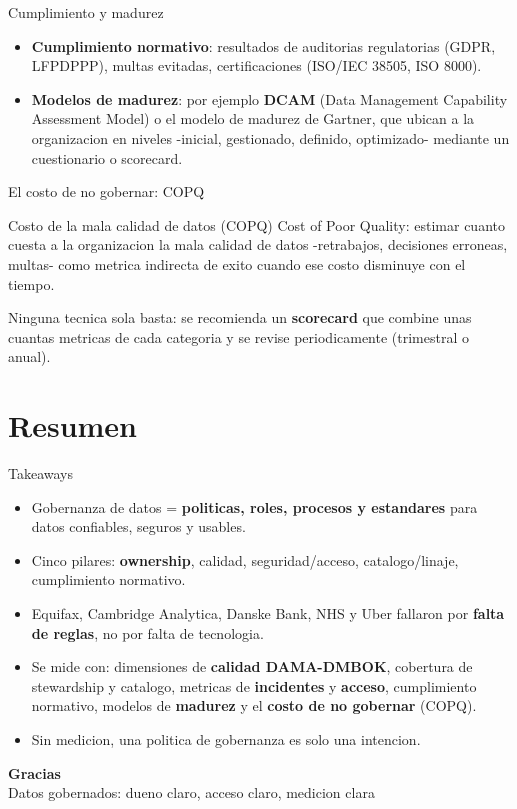 \documentclass[aspectratio=169]{beamer}
\begin{document}
\begin{frame}{Cumplimiento y madurez}
  \begin{itemize}
    \item \textbf{Cumplimiento normativo}: resultados de auditorias
          regulatorias (GDPR, LFPDPPP), multas evitadas, certificaciones
          (ISO/IEC 38505, ISO 8000).
    \item \textbf{Modelos de madurez}: por ejemplo \textbf{DCAM} (Data
          Management Capability Assessment Model) o el modelo de madurez de
          Gartner, que ubican a la organizacion en niveles -inicial,
          gestionado, definido, optimizado- mediante un cuestionario o
          scorecard.
  \end{itemize}
\end{frame}

\begin{frame}{El costo de no gobernar: COPQ}
  \begin{block}{Costo de la mala calidad de datos (COPQ)}
    Cost of Poor Quality: estimar cuanto cuesta a la organizacion la mala
    calidad de datos -retrabajos, decisiones erroneas, multas- como metrica
    indirecta de exito cuando ese costo disminuye con el tiempo.
  \end{block}
  Ninguna tecnica sola basta: se recomienda un \textbf{scorecard} que combine
  unas cuantas metricas de cada categoria y se revise periodicamente
  (trimestral o anual).
\end{frame}

\section{Resumen}

\begin{frame}{Takeaways}
  \begin{itemize}
    \item Gobernanza de datos = \textbf{politicas, roles, procesos y
          estandares} para datos confiables, seguros y usables.
    \item Cinco pilares: \textbf{ownership}, calidad, seguridad/acceso,
          catalogo/linaje, cumplimiento normativo.
    \item Equifax, Cambridge Analytica, Danske Bank, NHS y Uber fallaron por
          \textbf{falta de reglas}, no por falta de tecnologia.
    \item Se mide con: dimensiones de \textbf{calidad DAMA-DMBOK}, cobertura
          de stewardship y catalogo, metricas de \textbf{incidentes} y
          \textbf{acceso}, cumplimiento normativo, modelos de
          \textbf{madurez} y el \textbf{costo de no gobernar} (COPQ).
    \item Sin medicion, una politica de gobernanza es solo una intencion.
  \end{itemize}
\end{frame}

\begin{frame}[plain]
  \molinaBanner
  \vfill
  \begin{center}
    {\color{molMorado}\Large\bfseries Gracias}\\[0.4em]
    {\color{molTeal} Datos gobernados: dueno claro, acceso claro, medicion clara}
  \end{center}
  \vfill\vspace{1.0cm}
  \molinaLogos
\end{frame}
\end{document}
